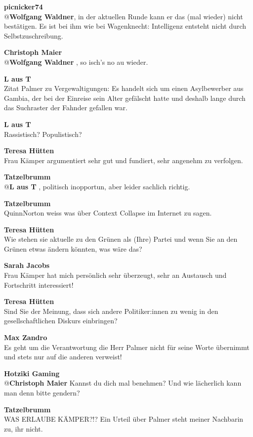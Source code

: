 \documentclass[]{article}
\begin{document}
\textbf{picnicker74}\\
@\textbf{Wolfgang Waldner}, in der aktuellen Runde kann er das (mal wieder)
nicht bestätigen. Es ist bei ihm wie bei Wagenknecht: Intelligenz
entsteht nicht durch Selbstzuschreibung.

\textbf{Christoph Maier}\\
@\textbf{Wolfgang Waldner} , so isch's no au wieder.

\textbf{L aus T}\\
Zitat Palmer zu Vergewaltigungen: Es handelt sich um einen Asylbewerber
aus Gambia, der bei der Einreise sein Alter gefälscht hatte und deshalb
lange durch das Suchraster der Fahnder gefallen war.

\textbf{L aus T}\\
Rassistisch? Populistisch?

\textbf{Teresa Hütten}\\
Frau Kämper argumentiert sehr gut und fundiert, sehr angenehm zu
verfolgen.

\textbf{Tatzelbrumm}\\
@\textbf{L aus T} , politisch inopportun, aber leider sachlich richtig.

\textbf{Tatzelbrumm}\\
QuinnNorton\cite{quinnnorton} weiss was über
Context Collapse\cite{contextcollapse} im Internet zu
sagen.

\textbf{Teresa Hütten}\\
Wie stehen sie aktuelle zu den Grünen als (Ihre) Partei und wenn Sie an
den Grünen etwas ändern könnten, was wäre das?

\textbf{Sarah Jacobs}\\
Frau Kämper hat mich persönlich sehr überzeugt, sehr an Austausch und
Fortschritt interessiert!

\textbf{Teresa Hütten}\\
Sind Sie der Meinung, dass sich andere Politiker:innen zu wenig in den
gesellschaftlichen Diskurs einbringen?

\textbf{Max Zandro}\\
Es geht um die Verantwortung die Herr Palmer nicht für seine Worte
übernimmt und stets nur auf die anderen verweist!

\textbf{Hotziki Gaming}\\
@\textbf{Christoph Maier} Kannst du dich mal benehmen? Und wie lächerlich
kann man denn bitte gendern?

\textbf{Tatzelbrumm}\\
WAS ERLAUBE KÄMPER?!? Ein Urteil über Palmer steht meiner Nachbarin zu,
ihr nicht.
\end{document}
